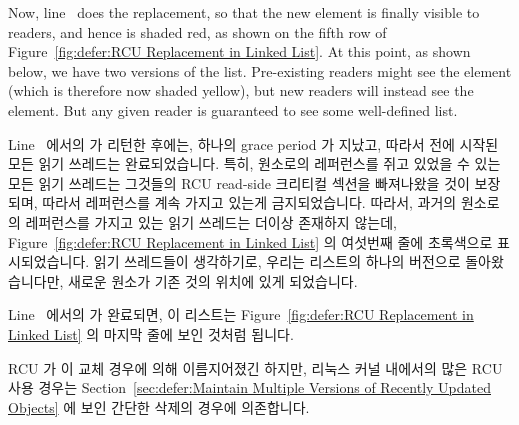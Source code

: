\begin{lineref}
Now, line~ does the replacement, so that the new element is
finally visible to readers, and hence is shaded red, as shown on
the fifth row of
Figure~\ref{fig:defer:RCU Replacement in Linked List}.
At this point, as shown below, we have two versions of the list.
Pre-existing readers might see the  element (which is
therefore now shaded yellow), but
new readers will instead see the  element.
But any given reader is guaranteed to see some well-defined list.
\fi

Line~ 에서의  가 리턴한 후에는, 하나의
grace period 가 지났고, 따라서  전에 시작된 모든 읽기
쓰레드는 완료되었습니다.
특히,  원소로의 레퍼런스를 쥐고 있었을 수 있는 모든 읽기 쓰레드는
그것들의 RCU read-side 크리티컬 섹션을 빠져나왔을 것이 보장되며, 따라서
레퍼런스를 계속 가지고 있는게 금지되었습니다.
따라서, 과거의 원소로의 레퍼런스를 가지고 있는 읽기 쓰레드는 더이상 존재하지
않는데,
Figure~\ref{fig:defer:RCU Replacement in Linked List} 의 여섯번째 줄에
초록색으로 표시되었습니다.
읽기 쓰레드들이 생각하기로, 우리는 리스트의 하나의 버전으로 돌아왔습니다만,
새로운 원소가 기존 것의 위치에 있게 되었습니다.

Line~ 에서의  가 완료되면, 이 리스트는
Figure~\ref{fig:defer:RCU Replacement in Linked List}
의 마지막 줄에 보인 것처럼 됩니다.

\end{lineref}

RCU 가 이 교체 경우에 의해 이름지어졌긴 하지만, 리눅스 커널 내에서의 많은 RCU
사용 경우는
Section~\ref{sec:defer:Maintain Multiple Versions of Recently Updated Objects}
에 보인 간단한 삭제의 경우에 의존합니다.
\iffalse


